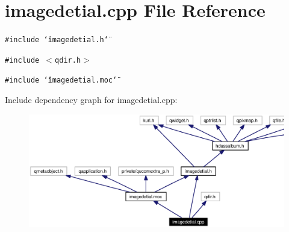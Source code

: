 \section{imagedetial.cpp File Reference}
\label{imagedetial_8cpp}


{\tt \#include \char`\"{}imagedetial.h\char`\"{}}\par
{\tt \#include $<$qdir.h$>$}\par
{\tt \#include \char`\"{}imagedetial.moc\char`\"{}}\par


Include dependency graph for imagedetial.cpp:\begin{figure}[H]
\begin{center}
\leavevmode
\includegraphics[width=374pt]{imagedetial_8cpp__incl}
\end{center}
\end{figure}
